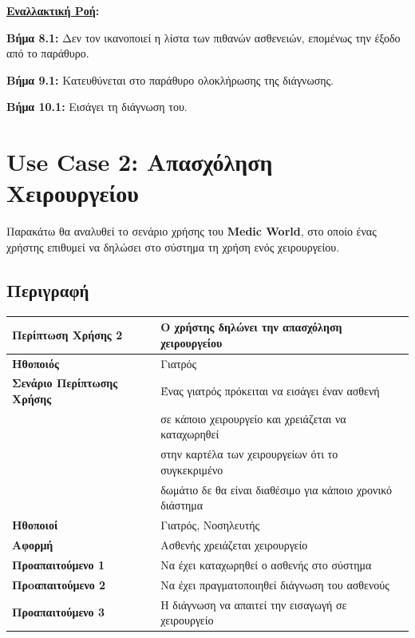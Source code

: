 \documentclass{article}
\newcommand\T{\rule{0pt}{2.6ex}}       %
\newcommand\B{\rule[-1.2ex]{0pt}{0pt}}
\begin{document}
 \vspace{0.1cm}
 
 \textbf{\underline{Εναλλακτική Ροή}:} \vspace{0.005cm} \\
\par \textbf{Βήμα 8.1:} Δεν τον ικανοποιεί η λίστα των πιθανών ασθενειών, επομένως  την έξοδο από το παράθυρο.\\
\par \textbf{Βήμα 9.1:} Κατευθύνεται στο παράθυρο ολοκλήρωσης της διάγνωσης.\\
\par \textbf{Βήμα 10.1:} Εισάγει τη διάγνωση του. \\

 
 \section{Use Case 2: Απασχόληση Χειρουργείου}
 
 Παρακάτω θα αναλυθεί το σενάριο χρήσης του \textbf{Medic World}, στο οποίο ένας χρήστης επιθυμεί να δηλώσει στο σύστημα τη χρήση ενός χειρουργείου.

\subsection{Περιγραφή}

\begin{center}
     \begin{tabular}{|l|l|}
     \hline
      \textbf{Περίπτωση Χρήσης 2} & Ο χρήστης δηλώνει την απασχόληση χειρουργείου \T\B \\ 
      \hline
      \textbf{Ηθοποιός} & Γιατρός \T\B \\
      \hline
      \textbf{Σενάριο Περίπτωσης Χρήσης} & Ένας γιατρός πρόκειται να εισάγει έναν ασθενή \T \\& σε κάποιο χειρουργείο και χρειάζεται να καταχωρηθεί\\& στην καρτέλα των χειρουργείων ότι το συγκεκριμένο\\& δωμάτιο δε θα είναι διαθέσιμο για κάποιο χρονικό διάστημα \B \\
      \hline
      \textbf{Ηθοποιοί} & Γιατρός, Νοσηλευτής \T\B \\
      \hline
      \textbf{Αφορμή} & Ασθενής χρειάζεται χειρουργείο \T\B \\
      \hline
      \textbf{Προαπαιτούμενο 1} & Να έχει καταχωρηθεί ο ασθενής στο σύστημα \T\B \\
      \hline
      \textbf{Πρoαπαιτούμενο 2} & Να έχει πραγματοποιηθεί διάγνωση του ασθενούς \T\B \\
      \hline
      \textbf{Προαπαιτούμενο 3} & Η διάγνωση να απαιτεί την εισαγωγή σε χειρουργείο \T\B \\
      \hline
     \end{tabular}
 \end{center}
 
\end{document}
